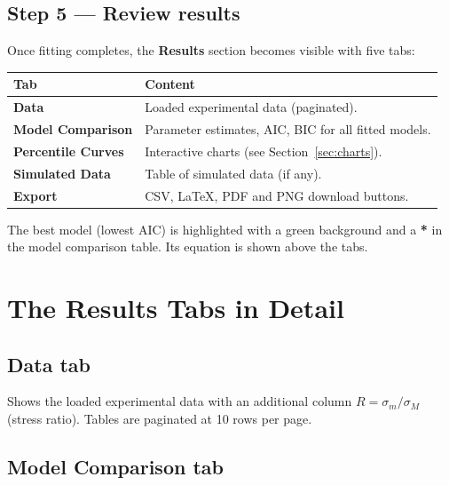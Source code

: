 \documentclass[11pt,a4paper]{article}
\newcommand{\sm}{\ensuremath{\sigma_m}}
\newcommand{\sM}{\ensuremath{\sigma_M}}
\begin{document}
\subsection{Step 5 --- Review results}

Once fitting completes, the \textbf{Results} section becomes visible with five tabs:

\begin{center}
\begin{tabularx}{\textwidth}{lX}
\toprule
\textbf{Tab} & \textbf{Content} \\
\midrule
\textbf{Data} & Loaded experimental data (paginated). \\
\textbf{Model Comparison} & Parameter estimates, AIC, BIC for all fitted models. \\
\textbf{Percentile Curves} & Interactive charts (see Section~\ref{sec:charts}). \\
\textbf{Simulated Data} & Table of simulated data (if any). \\
\textbf{Export} & CSV, LaTeX, PDF and PNG download buttons. \\
\bottomrule
\end{tabularx}
\end{center}

The best model (lowest AIC) is highlighted with a green background and a \textbf{*} in the model comparison table. Its equation is shown above the tabs.

\section{The Results Tabs in Detail}

\subsection{Data tab}

Shows the loaded experimental data with an additional column $R = \sm/\sM$ (stress ratio). Tables are paginated at 10 rows per page.

\subsection{Model Comparison tab}
\end{document}
